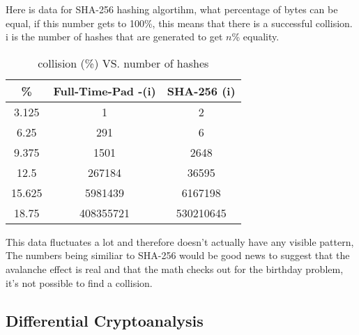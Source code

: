 \documentclass[fleqn, a4paper,12pt]{article}
\begin{document}
Here is data for SHA-256 hashing algortihm, what percentage of bytes can be equal, if this number gets to 100\%, this means that there is a successful collision. i is the number of hashes that are generated to get $n$\% equality.

\begin{table}[h!]
\centering
\begin{tabular}{|c|c|c|}
\hline
\textbf{\%} & \textbf{Full-Time-Pad -(i)} & \textbf{SHA-256 (i)} \\
\hline
		3.125 & 1 & 2 \\
\hline
		6.25 & 291 & 6 \\
\hline
		9.375 & 1501 & 2648 \\
\hline
		12.5 & 267184 & 36595 \\
\hline
		15.625 & 5981439 & 6167198  \\
\hline
		18.75 & 408355721 & 530210645 \\
\hline
\end{tabular}
\caption{collision (\%) VS. number of hashes}
\end{table}

This data fluctuates a lot and therefore doesn't actually have any visible pattern, The numbers being similiar to SHA-256 would be good news to suggest that the avalanche effect is real and that the math checks out for the birthday problem, it's not possible to find a collision.

%


\subsection{Differential Cryptoanalysis}
\end{document}
